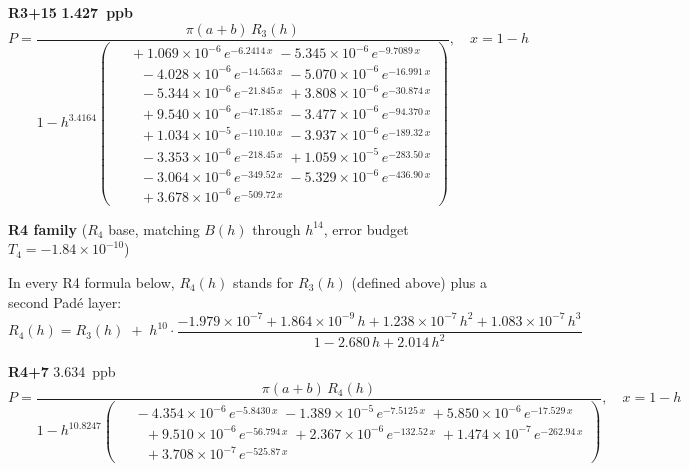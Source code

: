 \documentclass[12pt]{article}
\begin{document}
\noindent\textbf{R3+15} \textbf{1.427~ppb}\nopagebreak
\begin{equation*}
P = \frac{\pi(a{+}b)\,R_3(h)}{1 - h^{3.4164}\!\left(\!\begin{aligned}
  &\; +1.069{\times}10^{-6}\,e^{-6.2414\,x} \; -5.345{\times}10^{-6}\,e^{-9.7089\,x} \\[-3pt]
  &\quad -4.028{\times}10^{-6}\,e^{-14.563\,x} \; -5.070{\times}10^{-6}\,e^{-16.991\,x} \\[-3pt]
  &\quad -5.344{\times}10^{-6}\,e^{-21.845\,x} \; +3.808{\times}10^{-6}\,e^{-30.874\,x} \\[-3pt]
  &\quad +9.540{\times}10^{-6}\,e^{-47.185\,x} \; -3.477{\times}10^{-6}\,e^{-94.370\,x} \\[-3pt]
  &\quad +1.034{\times}10^{-5}\,e^{-110.10\,x} \; -3.937{\times}10^{-6}\,e^{-189.32\,x} \\[-3pt]
  &\quad -3.353{\times}10^{-6}\,e^{-218.45\,x} \; +1.059{\times}10^{-5}\,e^{-283.50\,x} \\[-3pt]
  &\quad -3.064{\times}10^{-6}\,e^{-349.52\,x} \; -5.329{\times}10^{-6}\,e^{-436.90\,x} \\[-3pt]
  &\quad +3.678{\times}10^{-6}\,e^{-509.72\,x}
\end{aligned}\!\right)}, \quad x = 1{-}h
\end{equation*}

\medskip\noindent\textbf{R4 family} ($R_4$ base, matching $B(h)$ through $h^{14}$, error budget $T_4 = -1.84 \times 10^{-10}$)\nopagebreak

\noindent In every R4 formula below, $R_4(h)$ stands for $R_3(h)$ (defined above) plus a second Pad\'e layer:
\[
R_4(h) = R_3(h) \;+\; h^{10}\!\cdot\!\frac{-1.979{\times}10^{-7} + 1.864{\times}10^{-9}\,h + 1.238{\times}10^{-7}\,h^2 + 1.083{\times}10^{-7}\,h^3}
       {1 - 2.680\,h + 2.014\,h^2}
\]

\noindent\textbf{R4+7} 3.634~ppb\nopagebreak
\begin{equation*}
P = \frac{\pi(a{+}b)\,R_4(h)}{1 - h^{10.8247}\!\left(\!\begin{aligned}
  &\; -4.354{\times}10^{-6}\,e^{-5.8430\,x} \; -1.389{\times}10^{-5}\,e^{-7.5125\,x} \; +5.850{\times}10^{-6}\,e^{-17.529\,x} \\[-3pt]
  &\quad +9.510{\times}10^{-6}\,e^{-56.794\,x} \; +2.367{\times}10^{-6}\,e^{-132.52\,x} \; +1.474{\times}10^{-7}\,e^{-262.94\,x} \\[-3pt]
  &\quad +3.708{\times}10^{-7}\,e^{-525.87\,x}
\end{aligned}\!\right)}, \quad x = 1{-}h
\end{equation*}
\end{document}
